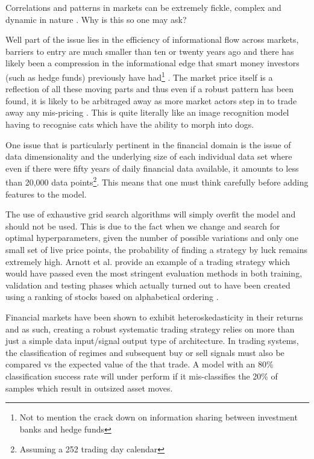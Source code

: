 \documentclass[11pt]{article}
\begin{document}
\par Correlations and patterns in markets can be extremely fickle, complex and dynamic in nature \cite{Camargo2013}. Why is this so one may ask? \par Well part of the issue lies in the efficiency of informational flow across markets, barriers to entry are much smaller than ten or twenty years ago and there has likely been a compression in the informational edge that smart money investors (such as hedge funds) previously have had\footnote{Not to mention the crack down on information sharing between investment banks and hedge funds} \cite{hedgefundRets}. The market price itself is a reflection of all these moving parts and thus even if a robust pattern has been found, it is likely to be arbitraged away as more market actors step in to trade away any mis-pricing \cite{Bartram2019}. This is quite literally like an image recognition model having to recognise cats which have the ability to morph into dogs.
\par
One issue that is particularly pertinent in the financial domain is the issue of data dimensionality and the underlying size of each individual data set where even if there were fifty years of daily financial data available, it amounts to less than 20,000 data points\footnote{Assuming a 252 trading day calendar}. This means that one must think carefully before adding features to the model.\par The use of exhaustive grid search algorithms will simply overfit the model and should not be used. This is due to the fact when we change and search for optimal hyperparameters, given the number of possible variations and only one small set of live price points, the probability of finding a strategy by luck remains extremely high. Arnott et al. provide an example of a trading strategy which would have passed even the most stringent evaluation methods in both training, validation and testing phases which actually turned out to have been created using a ranking of stocks based on alphabetical ordering \cite{Arnott2018}.

Financial markets have been shown to exhibit heteroskedasticity in their returns \cite{Corhay1996} and as such, creating a robust systematic trading strategy relies on more than just a simple data input/signal output type of architecture. In trading systems, the classification of regimes and subsequent buy or sell signals must also be compared vs the expected value of the that trade. A model with an 80\% classification success rate will under perform if it mis-classifies the 20\% of samples which result in outsized asset moves. \par
\end{document}

